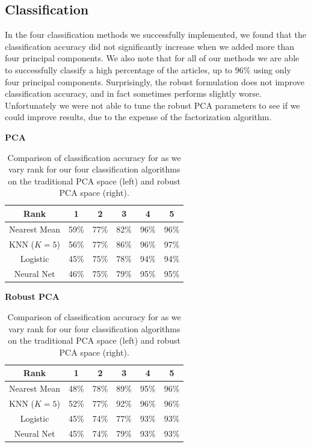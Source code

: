 \documentclass[12pt]{article}
\begin{document}
\subsection{Classification}
In the four classification methods we successfully implemented, we found that the classification accuracy did not significantly increase when we added more than four principal components. We also note that for all of our methods we are able to successfully classify a high percentage of the articles, up to $96\%$ using only four principal components. Surprisingly, the robust formulation does not improve classification accuracy, and in fact sometimes performs slightly worse. Unfortunately we were not able to tune the robust PCA parameters to see if we could improve results, due to the expense of the factorization algorithm. 

\begin{table}[H]
\begin{minipage}{0.5\textwidth}
\begin{center}\textbf{PCA}\end{center}
\begin{tabular}{c | c | c | c | c | c}
 {\bf Rank } & {\bf 1 } & {\bf 2} & {\bf 3} & {\bf 4} & {\bf 5 } \\ \hline
Nearest Mean & 59\% & 77\% & 82\% & 96\%  & 96\% \\
KNN ($K = 5$) & 56\% & 77\% & 86\% & 96\%  & 97\% \\
Logistic & 45\% & 75\% & 78\% & 94\%  & 94\% \\
Neural Net & 46\% & 75\% & 79\% & 95\%  & 95\%
\end{tabular}
\end{minipage}
\begin{minipage}{0.5\textwidth}
\begin{center}\textbf{Robust PCA}\end{center}
\begin{tabular}{c | c | c | c | c | c}
 {\bf Rank } & {\bf 1 } & {\bf 2} & {\bf 3} & {\bf 4} & {\bf 5 } \\ \hline
Nearest Mean & 48\% & 78\% & 89\% & 95\%  & 96\% \\
KNN ($K = 5$) & 52\% & 77\% & 92\% & 96\%  & 96\% \\
Logistic & 45\% & 74\% & 77\% & 93\%  & 93\% \\
Neural Net & 45\% & 74\% & 79\% & 93\%  & 93\%
\end{tabular}
\end{minipage}
\caption{Comparison of classification accuracy for as we vary rank for our four classification algorithms on the traditional PCA space (left) and robust PCA space (right).}
\end{table}
\end{document}
